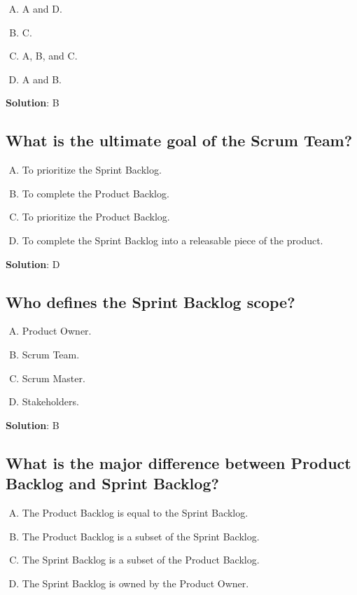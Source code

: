 \begin{enumerate}[A)]
  \item A and D.
  \item C.
  \item A, B, and C.
  \item A and B.
\end{enumerate}


\textbf{Solution}: B


\subsection{What is the ultimate goal of the Scrum Team? }
\begin{enumerate}[A)]
  \item To prioritize the Sprint Backlog.
  \item To complete the Product Backlog.
  \item To prioritize the Product Backlog.
  \item To complete the Sprint Backlog into a releasable piece of the product.
\end{enumerate}


\textbf{Solution}: D



\subsection{Who defines the Sprint Backlog scope?}
\begin{enumerate}[A)]
  \item Product Owner.
  \item Scrum Team.
  \item Scrum Master.
  \item Stakeholders.
\end{enumerate}


\textbf{Solution}: B


\subsection{What is the major difference between Product Backlog and Sprint Backlog?}
\begin{enumerate}[A)]
  \item The Product Backlog is equal to the Sprint Backlog.
  \item The Product Backlog is a subset of the Sprint Backlog.
  \item The Sprint Backlog is a subset of the Product Backlog.
  \item The Sprint Backlog is owned by the Product Owner.
\end{enumerate}


